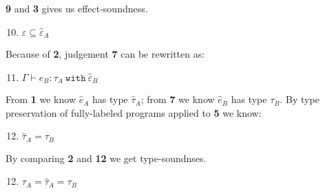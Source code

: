 \documentclass{llncs}
\newcommand{\keywadj}[1]{\mathtt{#1}}
\newcommand{\keyw}[1]{\keywadj{#1}~}
\newcommand{\type}[2]{
	#1~\keyw{with} #2
}
\begin{document}
{\noindent
\textbf{9} and \textbf{3} gives us effect-soundness.

\begin{adjustwidth}{1.5em}{0em}
\begin{enumerate}
	\setcounter{enumi}{9}
	\item $\varepsilon \subseteq \hat \varepsilon_A$ \\
\end{enumerate}
\end{adjustwidth}


\noindent
Because of \textbf{2}, judgement \textbf{7} can be rewritten as:

\begin{adjustwidth}{1.5em}{0em}
\begin{enumerate}
	\setcounter{enumi}{10}
	\item $\Gamma \vdash \hat e_B : \type{\tau_A}{\hat \varepsilon_B}$ \\
\end{enumerate}
\end{adjustwidth}

\noindent
From \textbf{1} we know $\hat e_A$ has type $\hat \tau_A$; from \textbf{7} we know $\hat e_B$ has type $\tau_B$. By type preservation of fully-labeled programs applied to \textbf{5} we know:

\begin{adjustwidth}{1.5em}{0em}
\begin{enumerate}
	\setcounter{enumi}{11}
	\item $\hat \tau_A = \tau_B$ \\
\end{enumerate}
\end{adjustwidth}

\noindent
By comparing \textbf{2} and \textbf{12} we get type-soundnses.

\begin{adjustwidth}{1.5em}{0em}
\begin{enumerate}
	\setcounter{enumi}{11}
	\item $\tau_A = \hat \tau_A = \tau_B$
\end{enumerate}
\end{adjustwidth}
}
\end{document}
